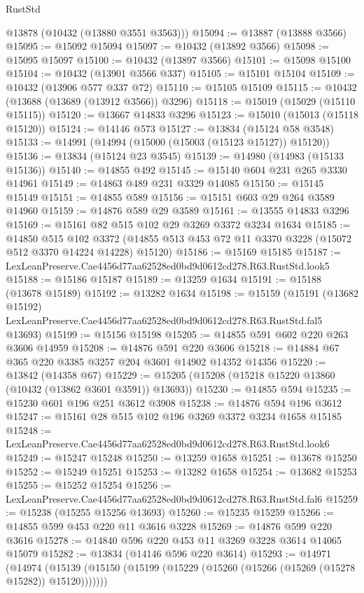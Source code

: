 \begin{lexlean}{RustStd}
\begin{coremodule}
      @13878
      (@10432 (@13880 @3551 @3563)))
@15094 := @13887 (@13888 @3566)
@15095 := @15092 @15094
@15097 := @10432 (@13892 @3566)
@15098 := @15095 @15097
@15100 := @10432 (@13897 @3566)
@15101 := @15098 @15100
@15104 := @10432 (@13901 @3566 @337)
@15105 := @15101 @15104
@15109 := @10432 (@13906 @577 @337 @72)
@15110 := @15105 @15109
@15115 := @10432 (@13688 (@13689 (@13912 @3566)) @3296)
@15118 := @15019 (@15029 (@15110 @15115))
@15120 := @13667 @14833 @3296
@15123 := @15010 (@15013 (@15118 @15120))
@15124 := @14146 @573
@15127 := @13834 (@15124 @58 @3548)
@15133 := @14991 (@14994 (@15000 (@15003 (@15123 @15127)) @15120))
@15136 := @13834 (@15124 @23 @3545)
@15139 := @14980 (@14983 (@15133 @15136))
@15140 := @14855 @492
@15145 := @15140 @604 @231 @265 @3330 @14961
@15149 := @14863 @489 @231 @3329 @14085
@15150 := @15145 @15149
@15151 := @14855 @589
@15156 := @15151 @603 @29 @264 @3589 @14960
@15159 := @14876 @589 @29 @3589
@15161 := @13555 @14833 @3296
@15169 := @15161 @82 @515 @102 @29 @3269 @3372 @3234 @1634
@15185 := @14850
    @515
    @102
    @3372
    (@14855 @513 @453 @72 @11 @3370 @3228 (@15072 @512 @3370 @14224 @14228) @15120)
@15186 := @15169 @15185
@15187 := LexLeanPreserve.Cae4456d77aa62528ed0bd9d0612cd278.R63.RustStd.look5
@15188 := @15186 @15187
@15189 := @13259 @1634
@15191 := @15188 (@13678 @15189)
@15192 := @13282 @1634
@15198 := @15159
    (@15191
      (@13682 @15192)
      LexLeanPreserve.Cae4456d77aa62528ed0bd9d0612cd278.R63.RustStd.fal5
      @13693)
@15199 := @15156 @15198
@15205 := @14855 @591 @602 @220 @263 @3606 @14959
@15208 := @14876 @591 @220 @3606
@15218 := @14884 @67 @365 @220 @3385 @3257 @204 @3601 @14902 @14352 @14356
@15220 := @13842 (@14358 @67)
@15229 := @15205 (@15208 (@15218 @15220 @13860 (@10432 (@13862 @3601 @3591)) @13693))
@15230 := @14855 @594
@15235 := @15230 @601 @196 @251 @3612 @3908
@15238 := @14876 @594 @196 @3612
@15247 := @15161 @28 @515 @102 @196 @3269 @3372 @3234 @1658 @15185
@15248 := LexLeanPreserve.Cae4456d77aa62528ed0bd9d0612cd278.R63.RustStd.look6
@15249 := @15247 @15248
@15250 := @13259 @1658
@15251 := @13678 @15250
@15252 := @15249 @15251
@15253 := @13282 @1658
@15254 := @13682 @15253
@15255 := @15252 @15254
@15256 := LexLeanPreserve.Cae4456d77aa62528ed0bd9d0612cd278.R63.RustStd.fal6
@15259 := @15238 (@15255 @15256 @13693)
@15260 := @15235 @15259
@15266 := @14855 @599 @453 @220 @11 @3616 @3228
@15269 := @14876 @599 @220 @3616
@15278 := @14840 @596 @220 @453 @11 @3269 @3228 @3614 @14065 @15079
@15282 := @13834 (@14146 @596 @220 @3614)
@15293 := @14971
    (@14974 (@15139 (@15150 (@15199 (@15229 (@15260 (@15266 (@15269 (@15278 @15282)) @15120)))))))

\end{coremodule}
\end{lexlean}
